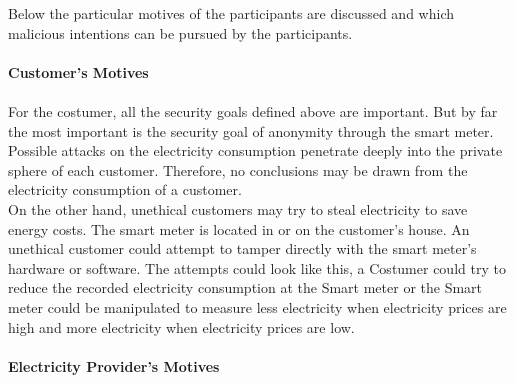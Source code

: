 Below the particular motives of the participants are discussed and which malicious intentions can be pursued by the participants.
\\
\\
\textbf{Customer's Motives}
\\
\\
For the costumer, all the security goals defined above are important. But by far the most important is the security goal of anonymity through the smart meter. Possible attacks on the electricity consumption penetrate deeply into the private sphere of each customer. Therefore, no conclusions may be drawn from the electricity consumption of a customer.\\
On the other hand, unethical customers may try to steal electricity to save energy costs. The smart meter is located in or on the customer's house. An unethical customer could attempt to tamper directly with the smart meter's hardware or software. The attempts could look like this, a Costumer could try to reduce the recorded electricity consumption at the Smart meter or the Smart meter could be manipulated to measure less electricity when electricity prices are high and more electricity when electricity prices are low.
\\
\\
\textbf{Electricity Provider's Motives}
\\
\\

